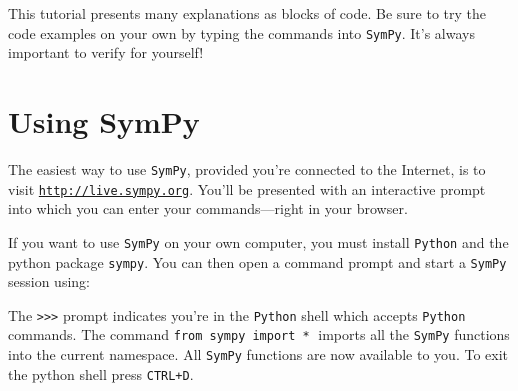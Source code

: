 

This tutorial presents many explanations as blocks of code. 
Be sure to try the code examples on your own by typing the commands into \texttt{SymPy}.
It's always important to verify for yourself!



\section*{Using SymPy}
\label{sec:sympytut_using_sympy}

The easiest way to use \texttt{SymPy},
provided you're connected to the Internet,
is to visit \href{http://live.sympy.org}{\texttt{http://live.sympy.org}}.
You'll be presented with an interactive prompt into which
you can enter your commands---right in your browser. 

If you want to use \texttt{SymPy} on your own computer,
you must install \texttt{Python} and the python package \texttt{sympy}.
You can then open a command prompt and start a \texttt{SymPy} session using:



\small
{}
\normalsize

\noindent
The \texttt{>{}>{}>} prompt indicates you're in the \texttt{Python} shell which accepts \texttt{Python} commands.
The command \texttt{from sympy import *}$\;$ imports all the \texttt{SymPy} functions into the current namespace. 
All \texttt{SymPy} functions are now available to you.
%
To exit the python shell press \texttt{CTRL+D}. 
%

